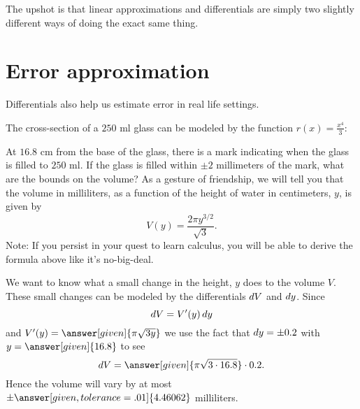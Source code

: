 \documentclass{ximera}
\begin{document}
The upshot is that linear approximations and differentials are simply
two slightly different ways of doing the exact same thing.

\section{Error approximation}

Differentials also help us estimate error in real life settings.

\begin{example}
  The cross-section of a $250$ ml glass can be modeled by the function
  $r(x) = \frac{x^4}{3}$:
  \begin{image}
  \end{image}
  At $16.8$ cm from the base of the glass, there is a mark indicating
  when the glass is filled to $250$ ml. If the glass is filled within
  $\pm 2$ millimeters of the mark, what are the bounds on the volume?
  As a gesture of friendship, we will tell you that the volume in
  milliliters, as a function of the height of water in centimeters, $y$,
  is given by
  \[
  V(y) = \frac{2\pi y^{3/2}}{\sqrt{3}}.
  \]
  Note: If you persist in your quest to learn calculus, you will be
  able to derive the formula above like it's no-big-deal.
  \begin{explanation}
    We want to know what a small change in the height, $y$ does to the
    volume $V$.  These small changes can be modeled by the
    differentials $\mathop{}\!d V$ and $\mathop{}\!d y$. Since
    \[
    \mathop{}\!d V = V'(y) \mathop{}\!d y
    \]
    and $V'(y) = \answer[given]{\pi \sqrt{3 y}}$ we use the fact that
    $\mathop{}\!d y = \pm 0.2$ with $y=\answer[given]{16.8}$ to see
    \[
    \d V = \answer[given]{\pi \sqrt{3 \cdot 16.8}} \cdot 0.2.
    \]
    Hence the volume will vary by at most $\pm\answer[given,tolerance=.01]{4.46062}$
    milliliters.
  \end{explanation}
\end{example}
\end{document}
